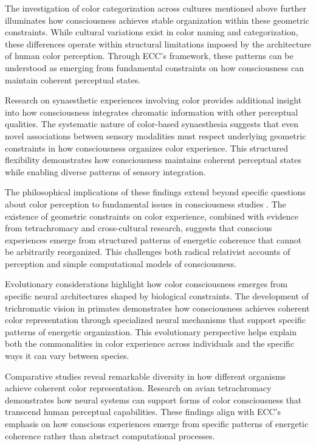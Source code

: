 The investigation of color categorization across cultures \cite{Kay2003} mentioned above further illuminates how consciousness achieves stable organization within these geometric constraints. While cultural variations exist in color naming and categorization, these differences operate within structural limitations imposed by the architecture of human color perception. Through ECC's framework, these patterns can be understood as emerging from fundamental constraints on how consciousness can maintain coherent perceptual states.

Research on synaesthetic experiences involving color \cite{HarrisonBaronCohen1997} provides additional insight into how consciousness integrates chromatic information with other perceptual qualities. The systematic nature of color-based synaesthesia suggests that even novel associations between sensory modalities must respect underlying geometric constraints in how consciousness organizes color experience. This structured flexibility demonstrates how consciousness maintains coherent perceptual states while enabling diverse patterns of sensory integration.

The philosophical implications of these findings extend beyond specific questions about color perception to fundamental issues in consciousness studies \cite{Palmer1999}. The existence of geometric constraints on color experience, combined with evidence from tetrachromacy and cross-cultural research, suggests that conscious experiences emerge from structured patterns of energetic coherence that cannot be arbitrarily reorganized. This challenges both radical relativist accounts of perception and simple computational models of consciousness.

Evolutionary considerations highlight how color consciousness emerges from specific neural architectures shaped by biological constraints. The development of trichromatic vision in primates \cite{Neitz2017} demonstrates how consciousness achieves coherent color representation through specialized neural mechanisms that support specific patterns of energetic organization. This evolutionary perspective helps explain both the commonalities in color experience across individuals and the specific ways it can vary between species.

Comparative studies reveal remarkable diversity in how different organisms achieve coherent color representation. Research on avian tetrachromacy \cite{Wilkins2020} demonstrates how neural systems can support forms of color consciousness that transcend human perceptual capabilities. These findings align with ECC's emphasis on how conscious experiences emerge from specific patterns of energetic coherence rather than abstract computational processes.

